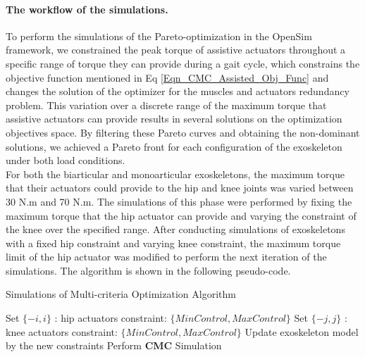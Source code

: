 \documentclass[10pt,letterpaper]{article}
\begin{document}
\paragraph*{The workflow of the simulations.} To perform the simulations of the Pareto-optimization in the OpenSim framework, we constrained the peak torque of assistive actuators throughout a specific range of torque they can provide during a gait cycle, which constrains the objective function mentioned in Eq \eqref{Eqn_CMC_Assisted_Obj_Func} and changes the solution of the optimizer for the muscles and actuators redundancy problem. This variation over a discrete range of the maximum torque that assistive actuators can provide results in several solutions on the optimization objectives space. By filtering these Pareto curves and obtaining the non-dominant solutions, we achieved a Pareto front for each configuration of the exoskeleton under both load conditions.\\
For both the biarticular and monoarticular exoskeletons, the maximum torque that their actuators could provide to the hip and knee joints was varied between 30 N.m and 70 N.m. The simulations of this phase were performed by fixing the maximum torque that the hip actuator can provide and varying the constraint of the knee over the specified range. After conducting simulations of exoskeletons with a fixed hip constraint and varying knee constraint, the maximum torque limit of the hip actuator was modified to perform the next iteration of the simulations. The algorithm is shown in the following pseudo-code.\\
\begin{algorithm}\label{Algorithm_Pareto_simulation}
	\caption{Simulations of Multi-criteria Optimization Algorithm}\label{Pareto_Algorithm}
	\begin{algorithmic}[1]
		\State Set $\{-i,i\}$ : hip actuators constraint: $\{Min Control, Max Control\}$
		\State Set $\{-j,j\}$ : knee actuators constraint: $\{Min Control, Max Control\}$
		\State Update exoskeleton model by the new constraints
		\State Perform \textbf{CMC} Simulation
		\EndFor
		\EndFor
	\end{algorithmic}
\end{algorithm}
\end{document}
